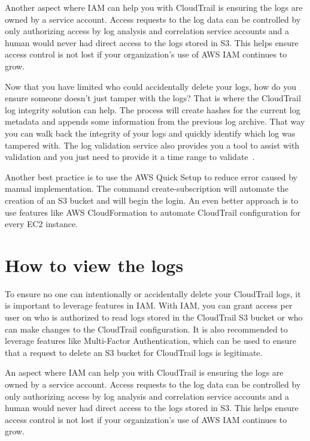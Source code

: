 Another aspect where IAM can help you with CloudTrail is ensuring the logs are 
owned by a service account. Access requests to the log data can be controlled 
by only authorizing access by log analysis and correlation service accounts and
 a human would never had direct access to the logs stored in S3. This helps 
ensure access control is not lost if your organization’s use of AWS IAM 
continues to grow. 

Now that you have limited who could accidentally delete your logs, how do you 
ensure someone doesn’t just tamper with the logs? That is where the CloudTrail 
log integrity solution can help. The process will create hashes for the current 
log metadata and appends some information from the previous log archive. That 
way you can walk back the integrity of your logs and quickly identify which log
 was tampered with. The log validation service also provides you a tool to 
assist with validation and you just need to provide it a time range to 
validate~\cite{hid-sp18-518-CloudTrail-user-guide}.

Another best practice is to use the AWS Quick Setup to reduce error caused by 
manual implementation. The command create-subscription will automate the 
creation of an S3 bucket and will begin the login. An even better approach is 
to use features like AWS CloudFormation to automate CloudTrail configuration 
for every EC2 instance.

\section{How to view the logs}

To ensure no one can intentionally or accidentally delete your CloudTrail logs,
 it is important to leverage features in IAM. With IAM, you can grant access 
per user on who is authorized to read logs stored in the CloudTrail S3 bucket 
or who can make changes to the CloudTrail configuration. It is also recommended 
to leverage features like Multi-Factor Authentication, which can be used to 
ensure that a request to delete an S3 bucket for CloudTrail logs is legitimate.
 
An aspect where IAM can help you with CloudTrail is ensuring the logs are owned 
by a service account. Access requests to the log data can be controlled by only 
authorizing access by log analysis and correlation service accounts and a human
 would never had direct access to the logs stored in S3. This helps ensure 
access control is not lost if your organization’s use of AWS IAM continues to 
grow. 

